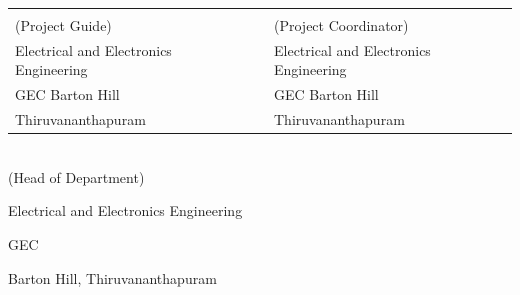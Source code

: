 \begin{singlespace}
	\vspace*{1.2cm}
	\begin{table}[h!]
		\centering
		\begin{tabular}{p{7cm} p{0.9cm} p{7cm}} 
			\textbf{\Supervisor} && \textbf{\Supervisorb} \\
			(Project Guide) &&  (Project Coordinator)\\
			Electrical and Electronics Engineering && Electrical and Electronics Engineering\\ 
			GEC Barton Hill && GEC Barton Hill\\
			Thiruvananthapuram && Thiruvananthapuram\\
		\end{tabular}
		
	\end{table}
	
	\vspace*{1cm}
	
	\begin{center}
		\centering
		
		\textbf{\Supervisora} \\ 
		(Head of Department)
		
		Electrical and Electronics Engineering
		
		GEC
		
		Barton Hill, Thiruvananthapuram
		
	\end{center}
\end{singlespace}


\thispagestyle{empty}